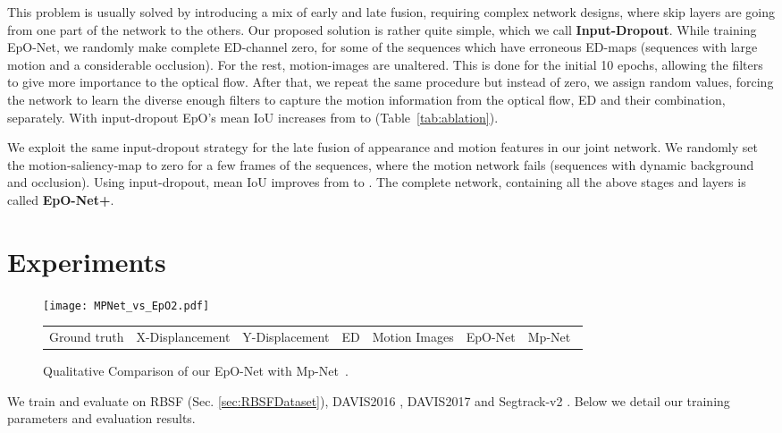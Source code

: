 \documentclass[10pt,twocolumn,letterpaper]{article}
\newcommand{\rowSpace}{\vspace{-0.4cm}}
\begin{document}
This problem is usually solved by introducing a mix of early and late fusion, requiring complex network designs, where skip layers are going from one part of the network to the others. Our proposed solution is rather quite simple, which we call \textbf{Input-Dropout}. 
While training EpO-Net, we randomly make complete ED-channel zero, for some of the sequences which have erroneous ED-maps (sequences with large motion and a considerable occlusion). For the rest, motion-images are unaltered. This is done for the initial 10 epochs, allowing the filters to give more importance to the optical flow. After that, we repeat the same procedure but instead of zero, we assign random values, forcing the network to learn the diverse enough filters to capture the motion information from the optical flow, ED and their combination, separately. With input-dropout EpO's mean IoU increases from  to  (Table~\ref{tab:ablation}).

We exploit the same input-dropout strategy for the late fusion of appearance and motion features in our joint network. 
We randomly set the motion-saliency-map to zero for a few frames of the sequences, where the motion network fails (sequences with dynamic background and occlusion). Using input-dropout, mean IoU improves from  to .
The complete network, containing all the above stages and layers is called \textbf{EpO-Net+}.
\vspace{-0.20cm} 
\section{Experiments}

\setlength{\tabcolsep}{0.5pt}
\begin{figure*}[!th]    
\center
\texttt{[image: MPNet\_vs\_EpO2.pdf]}

\begin{tabular}{P{1.0in}P{0.9in}P{1.0in}P{0.95in}P{0.95in}P{0.95in}P{1.0in}}

\small{Ground truth} & \small{X-Displancement} & \small{Y-Displacement} & \small{ED}  & \small{Motion Images} & \small{EpO-Net} & \small{Mp-Net~\cite{MpNet}} 
\end{tabular}
\rowSpace
\caption{Qualitative Comparison of our EpO-Net with Mp-Net~\cite{MpNet}.}
\label{fig:OurvsMpNet}
\rowSpace
\end{figure*}

We train and evaluate on RBSF (Sec. \ref{sec:RBSFDataset}), DAVIS2016 \cite{DAVIS2016}, DAVIS2017 \cite{DAVIS2017} and Segtrack-v2  \cite{segtrackv2}. 
Below we detail our training parameters and evaluation results. 
\end{document}
